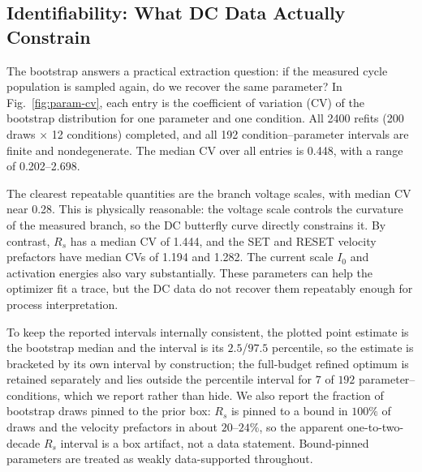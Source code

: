 \documentclass[journal]{IEEEtran}
\begin{document}
\subsection{Identifiability: What DC Data Actually Constrain}
\label{sec:res-ident}

The bootstrap answers a practical extraction question: if the measured cycle
population is sampled again, do we recover the same parameter?  In
Fig.~\ref{fig:param-cv}, each entry is the coefficient of variation (CV) of
the bootstrap distribution for one parameter and one condition.  All 2400
refits (200 draws $\times$ 12 conditions) completed, and all 192
condition--parameter intervals are finite and nondegenerate.  The median CV
over all entries is 0.448, with a range of 0.202--2.698.

The clearest repeatable quantities are the branch voltage scales, with median
CV near 0.28.  This is physically reasonable: the voltage scale controls the
curvature of the measured branch, so the DC butterfly curve directly
constrains it.  By contrast, $R_s$ has a median CV of 1.444, and the SET and
RESET velocity prefactors have median CVs of 1.194 and 1.282.  The current
scale $I_0$ and activation energies also vary substantially.  These
parameters can help the optimizer fit a trace, but the DC data do not recover
them repeatably enough for process interpretation.

To keep the reported intervals internally consistent, the plotted point
estimate is the bootstrap median and the interval is its $2.5$/$97.5$
percentile, so the estimate is bracketed by its own interval by construction;
the full-budget refined optimum is retained separately and lies outside the
percentile interval for $7$ of $192$ parameter--conditions, which we report
rather than hide.  We also report the fraction of bootstrap draws pinned to the
prior box: $R_s$ is pinned to a bound in $100\%$ of draws and the velocity
prefactors in about $20$--$24\%$, so the apparent one-to-two-decade $R_s$
interval is a box artifact, not a data statement.  Bound-pinned parameters are
treated as weakly data-supported throughout.
\end{document}

